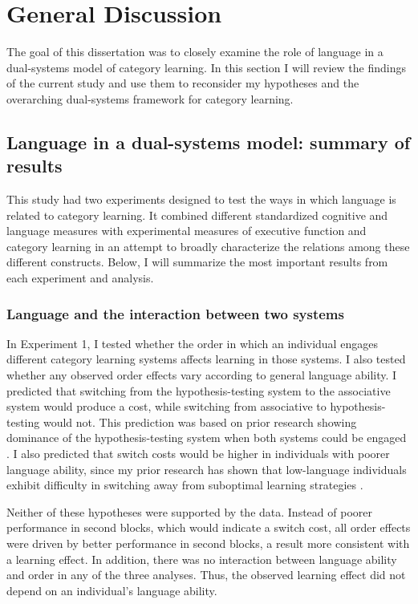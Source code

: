 \documentclass[../dissertation.tex]{subfiles}
\begin{document}
\section{General Discussion}

The goal of this dissertation was to closely examine the role of language in a dual-systems model of category learning. In this section I will review the findings of the current study and use them to reconsider my hypotheses and the overarching dual-systems framework for category learning.

\subsection{Language in a dual-systems model: summary of results}

This study had two experiments designed to test the ways in which language is related to category learning. It combined different standardized cognitive and language measures with experimental measures of executive function and category learning in an attempt to broadly characterize the relations among these different constructs. Below, I will summarize the most important results from each experiment and analysis.

\subsubsection{Language and the interaction between two systems}
	In Experiment 1, I tested whether the order in which an individual engages different category learning systems affects learning in those systems. I also tested whether any observed order effects vary according to general language ability. I predicted that switching from the hypothesis-testing system to the associative system would produce a cost, while switching from associative to hypothesis-testing would not. This prediction was based on prior research showing dominance of the hypothesis-testing system when both systems could be engaged \citep{Erickson2008, Ashby2010}. I also predicted that switch costs would be higher in individuals with poorer language ability, since my prior research has shown that low-language individuals exhibit difficulty in switching away from suboptimal learning strategies \citep{Ryherd2019}. \par 
	Neither of these hypotheses were supported by the data. Instead of poorer performance in second blocks, which would indicate a switch cost, all order effects were driven by better performance in second blocks, a result more consistent with a learning effect. In addition, there was no interaction between language ability and order in any of the three analyses. Thus, the observed learning effect did not depend on an individual's language ability.
\end{document}
